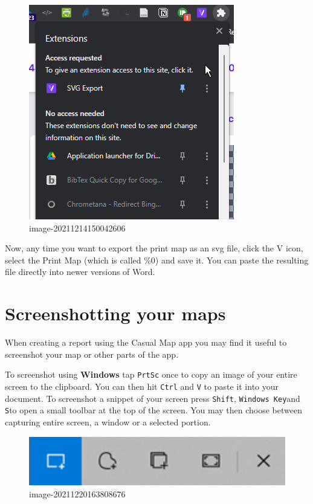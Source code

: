 \documentclass[
]{book}
\begin{document}
\begin{figure}
\centering
\includegraphics{_assets/image-20211214150042606.png}
\caption{image-20211214150042606}
\end{figure}

Now, any time you want to export the print map as an svg file, click the V icon, select the Print Map (which is called \%0) and save it. You can paste the resulting file directly into newer versions of Word.

\hypertarget{screenshotting-your-maps}{%
\chapter{Screenshotting your maps}\label{screenshotting-your-maps}}

When creating a report using the Casual Map app you may find it useful to screenshot your map or other parts of the app.

To screenshot using \textbf{Windows} tap \texttt{PrtSc} once to copy an image of your entire screen to the clipboard. You can then hit \texttt{Ctrl} and \texttt{V} to paste it into your document. To screenshot a snippet of your screen press \texttt{Shift}, \texttt{Windows\ Key}and \texttt{S}to open a small toolbar at the top of the screen. You may then choose between capturing entire screen, a window or a selected portion.

\begin{figure}
\centering
\includegraphics[width=6.77083in,height=\textheight]{_assets/image-20211220163808676.png}
\caption{image-20211220163808676}
\end{figure}
\end{document}
